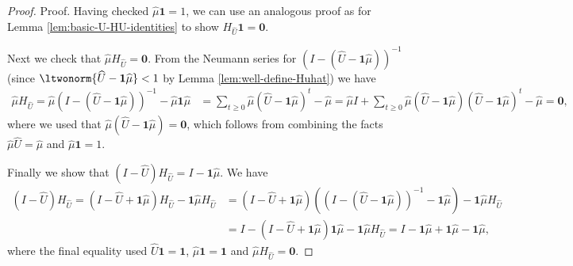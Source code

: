 \documentclass[mnsc,nonblindrev]{informs3}
\newcommand{\one}{\mathbf{1}}
\newcommand{\zero}{\mathbf{0}}
\newcommand{\muhat}{\widehat{\mu}}
\newcommand{\uhat}{\widehat{U}}
\begin{document}
\begin{APPENDICES}
\begin{proof}{Proof.}
        Having checked $\muhat \one = 1$, we can use an analogous proof as for Lemma \ref{lem:basic-U-HU-identities} to show $H_{\uhat} \one = \zero$.

        Next we check that $\muhat H_{\uhat} = \zero$. From the Neumann series for $(I - (\uhat - \one \muhat))^{-1}$ (since $\ltwonorm{\uhat - \one \muhat}<1$ by Lemma \ref{lem:well-define-Huhat}) we have
        \begin{align*}
            \muhat H_{\uhat} 
            = \muhat (I - (\uhat - \one \muhat))^{-1} - \muhat \one \muhat 
            &= \sum_{t \geq 0} \muhat (\uhat - \one \muhat)^t - \muhat 
            = \muhat I  + \sum_{t \geq 0 }\muhat(\uhat - \one \muhat) (\uhat - \one \muhat)^t - \muhat 
            = \zero,
        \end{align*}
        where we used that $\muhat(\uhat - \one \muhat) = \zero$, which follows from combining the facts $\muhat \uhat = \muhat$ and $ \muhat\one=1$.

        Finally we show that $(I - \uhat)H_{\uhat} = I - \one \muhat$. We have
        \begin{align*}
        (I - \uhat)H_{\uhat} 
        = (I - \uhat + \one \muhat)H_{\uhat} - \one \muhat H_{\uhat}  
        &= (I - \uhat + \one \muhat) \left((I - (\uhat - \one \muhat))^{-1} - \one \muhat \right) - \one \muhat H_{\uhat} \\
        &= I - (I - \uhat + \one \muhat)\one \muhat  - \one \muhat H_{\uhat} 
        = I - \one \muhat+ \one \muhat - \one\muhat ,
    \end{align*}
    where the final equality used $\uhat \one = \one $, $\muhat \one = \one$ and $\muhat H_{\uhat} =\zero$.
    

\end{proof}
\end{APPENDICES}
\end{document}
